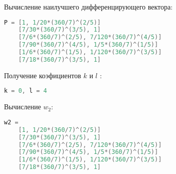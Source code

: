 \documentclass[specialist,
  substylefile = spbu.rtx,
  href,
  colorlinks=true,
  12pt]{disser}
\begin{document}
	Вычисление наилучшего дифференцирующего вектора:
	\begin{lstlisting}[language=c++,basicstyle=\footnotesize\ttfamily]
	P = [1, 1/20*(360/7)^(2/5)]
	[7/30*(360/7)^(3/5), 1]
	[7/6*(360/7)^(2/5), 7/120*(360/7)^(4/5)]
	[7/90*(360/7)^(4/5), 1/5*(360/7)^(1/5)]
	[1/6*(360/7)^(1/5), 1/120*(360/7)^(3/5)]
	[7/18*(360/7)^(3/5), 1]
\end{lstlisting}
	Получение коэфициентов $k$ и $l$
:
	\begin{lstlisting}[language=c++,basicstyle=\footnotesize\ttfamily]
	k = 0, l = 4
\end{lstlisting}
	Вычисление $w_2$:
	\begin{lstlisting}[language=c++,basicstyle=\footnotesize\ttfamily]
	w2 = 
	[1, 1/20*(360/7)^(2/5)]
	[7/30*(360/7)^(3/5), 1]
	[7/6*(360/7)^(2/5), 7/120*(360/7)^(4/5)]
	[7/90*(360/7)^(4/5), 1/5*(360/7)^(1/5)]
	[1/6*(360/7)^(1/5), 1/120*(360/7)^(3/5)]
	[7/18*(360/7)^(3/5), 1]
\end{lstlisting}
\end{document}
